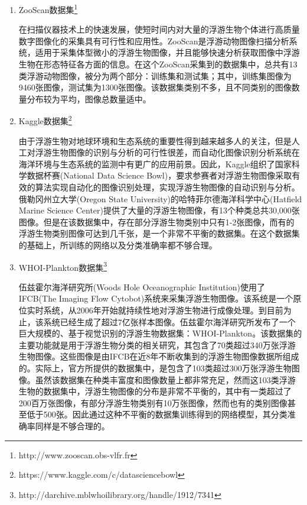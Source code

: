 \begin{enumerate}
\item ZooScan数据集\footnote{http://www.zooscan.obs-vlfr.fr}

在扫描仪器技术上的快速发展，使短时间内对大量的浮游生物个体进行高质量数字图像化的采集具有可行性和应用性。ZooScan是浮游动物图像扫描分析系统，适用于采集体型微小的浮游生物图像，并且能够快速分析获取图像中浮游生物在形态特征各方面的信息。在这个ZooScan采集到的数据集中，总共有13类浮游动物图像，被分为两个部分：训练集和测试集；其中，训练集图像为9460张图像，测试集为1300张图像。该数据集类别不多，且不同类别的图像数量分布较为平均，图像总数量适中。

\item Kaggle数据集\footnote{https://www.kaggle.com/c/datasciencebowl}

由于浮游生物对地球环境和生态系统的重要性得到越来越多人的关注，但是人工对浮游生物图像的识别与分析的可行性很差，而自动化图像识别分析系统在海洋环境与生态系统的监测中有更广的应用前景。因此，Kaggle组织了国家科学数据杯赛(National Data Science Bowl)，要求参赛者对浮游生物图像采取有效的算法实现自动化的图像识别处理，实现浮游生物图像的自动识别与分析。俄勒冈州立大学(Oregon State University)的哈特菲尔德海洋科学中心(Hatfield Marine Science Center)提供了大量的浮游生物图像，有13个种类总共30,000张图像。但是在该数据集中，存在部分浮游生物类别中只有1-2张图像，而有的浮游生物类别图像可达到几千张，是一个非常不平衡的数据集。在这个数据集的基础上，所训练的网络以及分类准确率都不够合理。

\item WHOI-Plankton数据集\footnote{http://darchive.mblwhoilibrary.org/handle/1912/7341 }

伍兹霍尔海洋研究所(Woods Hole Oceanographic Institution)使用了IFCB(The Imaging Flow Cytobot)系统来采集浮游生物图像\cite{orenstein2015whoi}。该系统是一个原位实时系统，从2006年开始就持续性地对浮游生物进行成像处理。到目前为止，该系统已经生成了超过7亿张样本图像。伍兹霍尔海洋研究所发布了一个巨大规模的、基于视觉识别的浮游生物数据集：WHOI-Plankton。该数据集的主要功能就是用于浮游生物分类的相关研究，其包含了70类超过340万张浮游生物图像。这些图像是由IFCB在近8年不断收集到的浮游生物图像数据所组成的。实际上，官方所提供的数据集中，是包含了103类超过300万张浮游生物图像。虽然该数据集在种类丰富度和图像数量上都非常充足，然而这103类浮游生物的数据集中，浮游生物图像的分布是非常不平衡的，其中有一类超过了200百万张图像，有部分浮游生物类别有10万张图像，然而也有的类别图像甚至低于500张。因此通过这种不平衡的数据集训练得到的网络模型，其分类准确率同样是不够合理的。

\end{enumerate}

